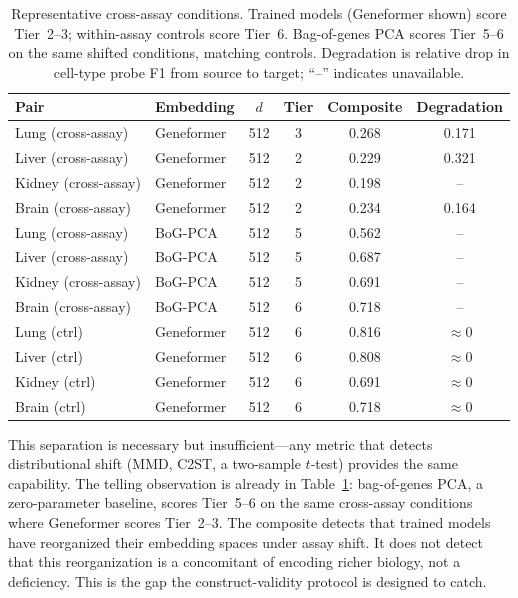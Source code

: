 \documentclass[9pt,lineno]{elife}
\begin{document}
\begin{table}[t]
\centering
\caption{Representative cross-assay conditions. Trained models (Geneformer shown) score Tier~2--3; within-assay controls score Tier~6. Bag-of-genes PCA scores Tier~5--6 on the same shifted conditions, matching controls. Degradation is relative drop in cell-type probe F1 from source to target; ``--'' indicates unavailable.}
\label{tab:separation}
\small
\begin{tabular}{@{}llcccc@{}}
\toprule
Pair & Embedding & $d$ & Tier & Composite & Degradation \\
\midrule
Lung (cross-assay) & Geneformer & 512 & 3 & 0.268 & 0.171 \\
Liver (cross-assay) & Geneformer & 512 & 2 & 0.229 & 0.321 \\
Kidney (cross-assay) & Geneformer & 512 & 2 & 0.198 & -- \\
Brain (cross-assay) & Geneformer & 512 & 2 & 0.234 & 0.164 \\
\midrule
Lung (cross-assay) & BoG-PCA & 512 & 5 & 0.562 & -- \\
Liver (cross-assay) & BoG-PCA & 512 & 5 & 0.687 & -- \\
Kidney (cross-assay) & BoG-PCA & 512 & 5 & 0.691 & -- \\
Brain (cross-assay) & BoG-PCA & 512 & 6 & 0.718 & -- \\
\midrule
Lung (ctrl) & Geneformer & 512 & 6 & 0.816 & $\approx 0$ \\
Liver (ctrl) & Geneformer & 512 & 6 & 0.808 & $\approx 0$ \\
Kidney (ctrl) & Geneformer & 512 & 6 & 0.691 & $\approx 0$ \\
Brain (ctrl) & Geneformer & 512 & 6 & 0.718 & $\approx 0$ \\
\bottomrule
\end{tabular}
\end{table}

This separation is necessary but insufficient---any metric that detects distributional shift (MMD, C2ST, a two-sample $t$-test) provides the same capability. The telling observation is already in Table~\ref{tab:separation}: bag-of-genes PCA, a zero-parameter baseline, scores Tier~5--6 on the same cross-assay conditions where Geneformer scores Tier~2--3. The composite detects that trained models have reorganized their embedding spaces under assay shift. It does not detect that this reorganization is a concomitant of encoding richer biology, not a deficiency. This is the gap the construct-validity protocol is designed to catch.
\end{document}

